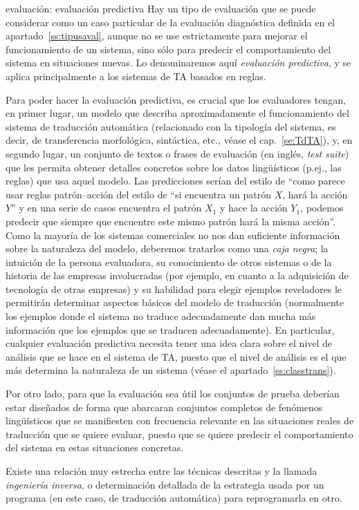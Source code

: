 \begin{persabermes}{evaluación: evaluación predictiva} Hay un tipo de evaluación que se puede considerar como un caso particular de la evaluación diagnóstica definida en el apartado~\ref{ss:tipusaval}, aunque no se use estrictamente para mejorar el funcionamiento de un sistema, sino sólo para predecir el comportamiento del sistema en situaciones nuevas. Lo denominaremos aquí \emph{evaluación predictiva}, y se aplica principalmente a los sistemas de TA basados en reglas. 

Para poder hacer la evaluación predictiva, es crucial que los evaluadores tengan, en primer lugar, un modelo que describa aproximadamente el funcionamiento del sistema de traducción automática (relacionado con la tipología del sistema, es decir, de transferencia morfológica, sintáctica, etc., véase el cap.~\ref{se:TdTA}), y, en segundo lugar, un conjunto de textos o frases de evaluación (en inglés, \emph{test suite}) que les permita obtener detalles concretos sobre los datos lingüísticos (p.ej., las reglas) que usa aquel modelo. Las predicciones serían del estilo de ``como parece usar reglas patrón--acción del estilo de ``si encuentra un patrón $X$, hará la acción $Y$'' y en una serie de casos encuentra el patrón $X_1$ y hace la acción $Y_1$, podemos predecir que siempre que encuentre este mismo patrón hará la misma acción''. Como la mayoría de los sistemas comerciales no nos dan suficiente información sobre la naturaleza del modelo, deberemos tratarlos como una \emph{caja negra}; la intuición de la persona evaluadora, su conocimiento de otros sistemas o de la historia de las empresas involucradas (por ejemplo, en cuanto a la adquisición de tecnología de otras empresas) y su habilidad para elegir ejemplos reveladores le permitirán determinar aspectos básicos del modelo de traducción (normalmente los ejemplos donde el sistema no traduce adecuadamente dan mucha más información que los ejemplos que se traducen adecuadamente). En particular, cualquier evaluación predictiva necesita tener una idea clara sobre el nivel de análisis que se hace en el sistema de TA, puesto que el nivel de análisis es el que más determina la naturaleza de un sistema (véase el apartado~\ref{ss:classtrans}). 

Por otro lado, para que la evaluación sea útil los conjuntos de prueba deberían estar diseñados de forma que abarcaran conjuntos completos de fenómenos lingüísticos que se manifiesten con frecuencia relevante en las situaciones reales de traducción que se quiere evaluar, puesto que se quiere predecir el comportamiento del sistema en estas situaciones concretas. 

Existe una relación muy estrecha entre las técnicas descritas y la llamada \emph{ingeniería inversa}, o determinación detallada de la estrategia usada por un programa (en este caso, de traducción automática) para reprogramarla en otro. \end{persabermes} 

